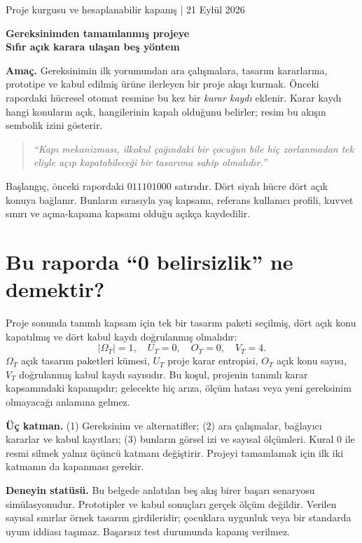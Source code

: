 \documentclass[11pt,a4paper]{article}
\newcommand{\heading}[2]{{\sffamily\small\color{blue!40!black}#1}\par{\sffamily\LARGE\bfseries#2}\par\vspace{3mm}}
\begin{document}
\heading{Proje kurgusu ve hesaplanabilir kapanış | 21 Eylül 2026}{Gereksinimden tamamlanmış projeye\\Sıfır açık karara ulaşan beş yöntem}
\textbf{Amaç.} Gereksinimin ilk yorumundan ara çalışmalara, tasarım kararlarına,
prototipe ve kabul edilmiş ürüne ilerleyen bir proje akışı kurmak.
Önceki rapordaki hücresel otomat resmine bu kez bir \emph{karar kaydı} eklenir.
Karar kaydı hangi konuların açık, hangilerinin kapalı olduğunu belirler;
resim bu akışın sembolik izini gösterir.

\begin{quote}\itshape
``Kapı mekanizması, ilkokul çağındaki bir çocuğun bile hiç zorlanmadan tek eliyle
açıp kapatabileceği bir tasarıma sahip olmalıdır.''
\end{quote}
Başlangıç, önceki rapordaki $011101000$ satırıdır. Dört siyah hücre dört açık
konuya bağlanır. Bunların sırasıyla yaş kapsamı, referans kullanıcı profili,
kuvvet sınırı ve açma-kapama kapsamı olduğu açıkça kaydedilir.

\section*{Bu raporda ``0 belirsizlik'' ne demektir?}
Proje sonunda tanımlı kapsam için tek bir tasarım paketi seçilmiş, dört açık
konu kapatılmış ve dört kabul kaydı doğrulanmış olmalıdır:
\[
|\Omega_T|=1,\quad U_T=0,\quad O_T=0,\quad V_T=4.
\]
$\Omega_T$ açık tasarım paketleri kümesi, $U_T$ proje karar entropisi,
$O_T$ açık konu sayısı, $V_T$ doğrulanmış kabul kaydı sayısıdır.
Bu koşul, projenin tanımlı karar kapsamındaki kapanışıdır; gelecekte hiç arıza,
ölçüm hatası veya yeni gereksinim olmayacağı anlamına gelmez.

\textbf{Üç katman.} (1) Gereksinim ve alternatifler; (2) ara çalışmalar,
bağlayıcı kararlar ve kabul kayıtları; (3) bunların görsel izi ve sayısal ölçümleri.
Kural 0 ile resmi silmek yalnız üçüncü katmanı değiştirir. Projeyi tamamlamak
için ilk iki katmanın da kapanması gerekir.

\textbf{Deneyin statüsü.} Bu belgede anlatılan beş akış birer başarı senaryosu
simülasyonudur. Prototipler ve kabul sonuçları gerçek ölçüm değildir.
Verilen sayısal sınırlar örnek tasarım girdileridir; çocuklara uygunluk veya
bir standarda uyum iddiası taşımaz. Başarısız test durumunda kapanış verilmez.
\end{document}
